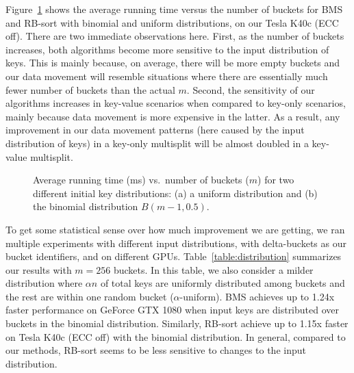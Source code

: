 Figure~\ref{fig:binomial} shows the average running time versus the number of buckets for BMS and RB-sort with binomial and uniform distributions, on our Tesla K40c (ECC off).
There are two immediate observations here.
First, as the number of buckets increases, both algorithms become more sensitive to the input distribution of keys.
This is mainly because, on average, there will be more empty buckets and our data movement will resemble situations where there are essentially much fewer number of buckets than the actual $m$.
Second, the sensitivity of our algorithms increases in key-value scenarios when compared to key-only scenarios, mainly because data movement is more expensive in the latter. As a result, any improvement in our data movement patterns (here caused by the input distribution of keys) in a key-only multisplit will be almost doubled in a key-value multisplit.

\begin{figure}
  \centering
  \caption{Average running time (ms) vs.\ number of buckets ($m$) for two different initial key distributions: (a) a uniform distribution and (b) the binomial distribution $B(m-1,0.5)$.}\label{fig:binomial}
\end{figure}

To get some statistical sense over how much improvement we are getting, we ran multiple experiments with different input distributions, with delta-buckets as our bucket identifiers, and on different GPUs. Table~\ref{table:distribution} summarizes our results with $m=256$ buckets.
In this table, we also consider a milder distribution where $\alpha n$ of total keys are uniformly distributed among buckets and the rest are within one random bucket ($\alpha$-uniform).
BMS achieves up to 1.24x faster performance on GeForce GTX 1080 when input keys are distributed over buckets in the binomial distribution. Similarly, RB-sort achieve up to 1.15x faster on Tesla K40c (ECC off) with the binomial distribution.
In general, compared to our methods, RB-sort seems to be less sensitive to changes to the input distribution.




